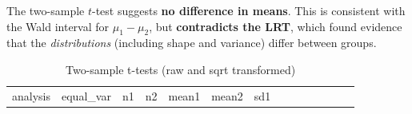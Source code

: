 \documentclass[
]{article}
\begin{document}
The two-sample \(t\)-test suggests \textbf{no difference in means}. This
is consistent with the Wald interval for \(\mu_1-\mu_2\), but
\textbf{contradicts the LRT}, which found evidence that the
\emph{distributions} (including shape and variance) differ between
groups.

\begin{longtable}[]{@{}
  >{\raggedright\arraybackslash}p{}
  >{\raggedright\arraybackslash}p{}
  >{\raggedleft\arraybackslash}p{}
  >{\raggedleft\arraybackslash}p{}
  >{\raggedleft\arraybackslash}p{}
  >{\raggedleft\arraybackslash}p{}
  >{\raggedleft\arraybackslash}p{}
  >{\raggedleft\arraybackslash}p{}
  >{\raggedleft\arraybackslash}p{}
  >{\raggedleft\arraybackslash}p{}
  >{\raggedleft\arraybackslash}p{}
  >{\raggedleft\arraybackslash}p{}
  >{\raggedleft\arraybackslash}p{}
  >{\raggedright\arraybackslash}p{}@{}}
\caption{Two-sample t-tests (raw and sqrt transformed)}\tabularnewline
\toprule\noalign{}
\begin{minipage}[b]{\linewidth}\raggedright
analysis
\end{minipage} & \begin{minipage}[b]{\linewidth}\raggedright
equal\_var
\end{minipage} & \begin{minipage}[b]{\linewidth}\raggedleft
n1
\end{minipage} & \begin{minipage}[b]{\linewidth}\raggedleft
n2
\end{minipage} & \begin{minipage}[b]{\linewidth}\raggedleft
mean1
\end{minipage} & \begin{minipage}[b]{\linewidth}\raggedleft
mean2
\end{minipage} & \begin{minipage}[b]{\linewidth}\raggedleft
sd1
\end{minipage} & \begin{minipage}[b]{\linewidth}\raggedleft

\end{minipage}
\end{longtable}
\end{document}
